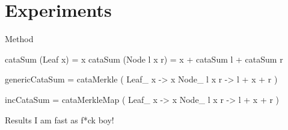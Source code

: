\section{Experiments}

\begin{slide}{Method}
\begin{haskell}
cataSum (Leaf x)     = x
cataSum (Node l x r) = x + cataSum l + cataSum r

genericCataSum = cataMerkle
  (\case
    Leaf_ x     -> x
    Node_ l x r -> l + x + r
  )

incCataSum = cataMerkleMap
  (\case
    Leaf_ x     -> x
    Node_ l x r -> l + x + r
  )
\end{haskell}
\end{slide}

\begin{slide}{Results}
I am fast as f*ck boy!
\end{slide}
